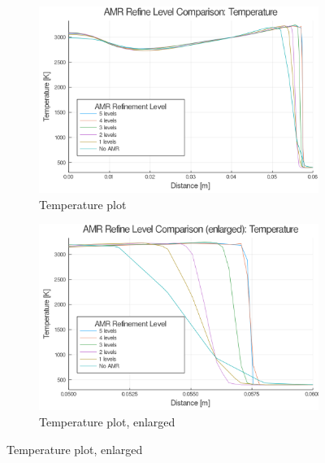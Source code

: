 \begin{figure} \ContinuedFloat

    \centering
    \begin{subfigure}[]{\textwidth}
        \centering
        \includegraphics[width=\textwidth]{./figs/amrfigs/amr_refinelevels/t.png}
        \caption{Temperature plot}
    \end{subfigure}

    \centering
    \begin{subfigure}[]{\textwidth}
        \centering
        \includegraphics[width=\textwidth]{./figs/amrfigs/amr_refinelevels/te.png}
        \caption{Temperature plot, enlarged}
    \end{subfigure}

\end{figure}
